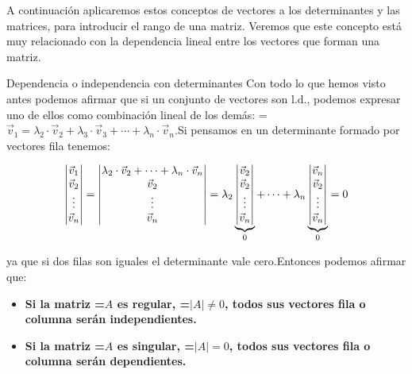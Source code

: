 \documentclass[11pt,a4paper]{article}
\newcommand{\fmm}[1]{\setbox0=\hbox{$#1$}\ifdim\wd0>\linewidth\fmdisp{#1}\else\mbox{\box0}\fi}
\newcommand{\fmdisp}[1]{\[\setbox2=\hbox{$\displaystyle #1$}\ifdim\wd2>\linewidth\resizebox{\linewidth}{!}{\box2}\else\box2\fi\]}
\begin{document}
A continuación aplicaremos estos conceptos de vectores a los determinantes y las matrices, para introducir el rango de una matriz. Veremos que este concepto está muy relacionado con la dependencia lineal entre los vectores que forman una matriz.

\begin{fmprop}{Dependencia o independencia con determinantes}
Con todo lo que hemos visto antes podemos afirmar que si un conjunto de vectores son l.d., podemos expresar uno de ellos como combinación lineal de los demás: \fmm{\vec v_1=\lambda_2\cdot\vec v_2+\lambda_3\cdot\vec v_3+\cdots+\lambda_n\cdot\vec v_n}.\newline Si pensamos en un determinante formado por vectores fila tenemos:

\fmdisp{\begin{vmatrix}\vec v_1\\ \vec v_2\\ \vdots\\ \vec v_n\end{vmatrix}=\begin{vmatrix}\lambda_2\cdot\vec v_2+\cdots+\lambda_n\cdot\vec v_n\\ \vec v_2\\ \vdots\\ \vec v_n\end{vmatrix}=\lambda_2\underbrace{\begin{vmatrix}\vec v_2\\ \vec v_2\\ \vdots\\ \vec v_n\end{vmatrix}}_{0}+\cdots+\lambda_n\underbrace{\begin{vmatrix}\vec v_n\\ \vec v_2\\ \vdots\\ \vec v_n\end{vmatrix}}_{0}=0}

ya que si dos filas son iguales el determinante vale cero.\newline Entonces podemos afirmar que:

\begin{itemize}
\item \textbf{Si la matriz \fmm{A} es regular, \fmm{|A|\neq0}, todos sus vectores fila o columna serán independientes.}
\item \textbf{Si la matriz \fmm{A} es singular, \fmm{|A|=0}, todos sus vectores fila o columna serán dependientes.}
\end{itemize}


\end{fmprop}
\end{document}
